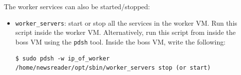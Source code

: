 \documentclass[a4]{article}
\begin{document}
The worker services can also be started/stopped:
\begin{itemize}
\item \texttt{worker\_servers}: start or stop all the services in the worker
  VM. Run this script inside the worker VM. Alternatively, run this script
  from inside the boss VM using the \texttt{pdsh} tool. Inside the boss VM,
  write the following:
\begin{verbatim}
$ sudo pdsh -w ip_of_worker /home/newsreader/opt/sbin/worker_servers stop (or start)
\end{verbatim}
\end{itemize}
\end{document}
